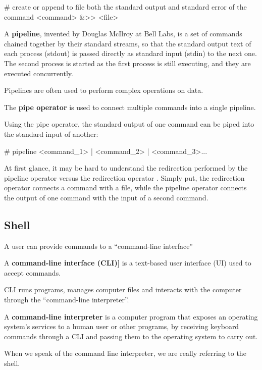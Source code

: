 \begin{bash}
# create or append to file both the standard output and standard error of the command
<command> &>> <file>
\end{bash}

\bd[Pipeline]
A \textbf{pipeline}, invented by Douglas McIlroy at Bell Labs, is a set of commands chained together by their standard
streams, so that the standard output text of each process (stdout) is passed directly as standard input (stdin) to the
next one. The second process is started as the first process is still executing, and they are executed concurrently.
\ed

Pipelines are often used to perform complex operations on data.

The \textbf{pipe operator} \code{|} is used to connect multiple commands into a single pipeline.
\ed

Using the pipe operator, the standard output of one command can be piped into the standard input of another:
\begin{bash}
# pipeline
<command_1> | <command_2> | <command_3>...
\end{bash}

At first glance, it may be hard to understand the redirection performed by the pipeline operator \code{|} versus the
redirection operator \code{>}. Simply put, the redirection operator connects a command with a file, while the pipeline
operator connects the output of one command with the input of a second command.

\subsection{Shell}

A user can provide commands to a ``command-line interface''

A \textbf{command-line interface (CLI)]} is a text-based user interface (UI) used to accept commands.
\ed

CLI runs programs, manages computer files and interacts with the computer through the ``command-line interpreter''.

A \textbf{command-line interpreter} is a computer program that exposes an operating system's services to a human user
or other programs, by receiving keyboard commands through a CLI and passing them to the operating system to carry out.
\ed

When we speak of the command line interpreter, we are really referring to the shell.

